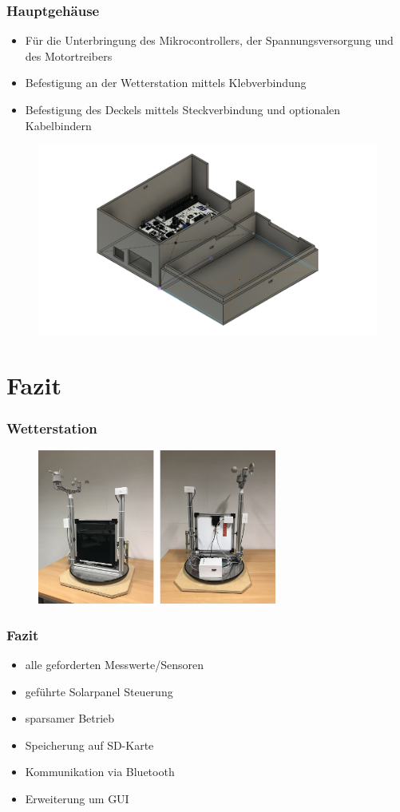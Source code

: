 \documentclass{beamer}
\begin{document}
\begin{frame}
  \frametitle{Hauptgehäuse}
  \begin{itemize}
  \item Für die Unterbringung des Mikrocontrollers, der Spannungsversorgung und des Motortreibers
  \item Befestigung an der Wetterstation mittels Klebverbindung
  \item Befestigung des Deckels mittels Steckverbindung und optionalen Kabelbindern
  \end{itemize}
  \begin{figure}[H]
    \centering
    \includegraphics[width=.7\textwidth]{./img/ST_MainBodyv13}
  \end{figure}
\end{frame}

\section{Fazit}
\begin{frame}
	\frametitle{Wetterstation}
	 \begin{figure}[H]
    		\centering
    		\includegraphics[width=0.7\textwidth]{./img/Wetterstaion_fertig1.JPG}
  	 \end{figure}
\end{frame}

\begin{frame}
	\frametitle{Fazit}
	
	\begin{itemize}
		\item alle geforderten Messwerte/Sensoren
		\item geführte Solarpanel Steuerung
		\item sparsamer Betrieb
		\item Speicherung auf SD-Karte
		\item Kommunikation via Bluetooth	
		\item Erweiterung um GUI
	\end{itemize}

\end{frame}
\end{document}
